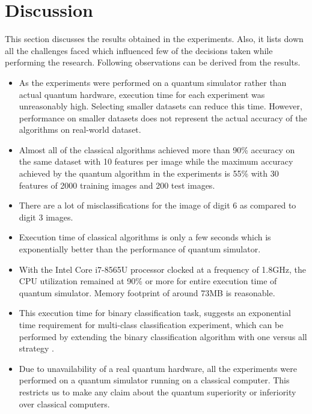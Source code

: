 \documentclass[english,a4paper,11pt,oneside,onecolumn]{book}
\begin{document}
\chapter{Discussion}
\label{sec:discus}
This section discusses the results obtained in the experiments. Also, it lists down all the challenges faced which influenced few of the decisions taken while performing the research. Following observations can be derived from the results.

\begin{itemize}
    \item As the experiments were performed on a quantum simulator rather than actual quantum hardware, execution time for each experiment was unreasonably high. Selecting smaller datasets can reduce this time. However, performance on smaller datasets does not represent the actual accuracy of the algorithms on real-world dataset.
    
    \item Almost all of the classical algorithms achieved more than 90\% accuracy on the same dataset with 10 features per image while the maximum accuracy achieved by the quantum algorithm in the experiments is 55\% with 30 features of 2000 training images and 200 test images.
    
    \item There are a lot of misclassifications for the image of digit 6 as compared to digit 3 images. 
    
    \item Execution time of classical algorithms is only a few seconds which is exponentially better than the performance of quantum simulator.
    
    \item With the Intel Core i7-8565U processor clocked at a frequency of 1.8GHz, the CPU utilization remained at 90\% or more for entire execution time of quantum simulator. Memory footprint of around 73MB is reasonable.
    
    \item This execution time for binary classification task, suggests an exponential time requirement for multi-class classification experiment, which can be performed by extending the binary classification algorithm with one versus all strategy \cite{schuld_2020_circuitcentric}.
    
    \item Due to unavailability of a real quantum hardware, all the experiments were performed on a quantum simulator running on a classical computer. This restricts us to make any claim about the quantum superiority or inferiority over classical computers.
\end{itemize}
\end{document}
